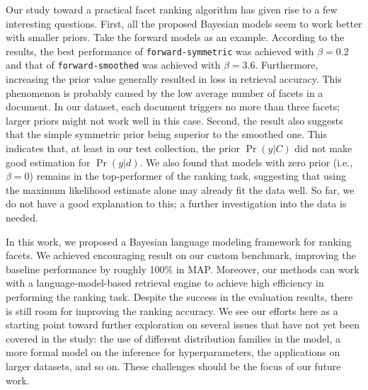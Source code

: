 Our study toward a practical facet ranking algorithm has given rise to a few
interesting questions.  First, all the proposed Bayesian models seem to work
better with smaller priors.  Take the forward models as an example.  According
to the results, the best performance of {\tt forward-symmetric} was achieved
with $\beta = 0.2$ and that of {\tt forward-smoothed} was achieved with $\beta
= 3.6$.  Furthermore, increasing the prior value generally resulted in loss in
retrieval accuracy.  This phenomenon is probably caused by the low average
number of facets in a document.  In our dataset, each document triggers no more
than three facets; larger priors might not work well in this case.  Second, the
result also suggests that the simple symmetric prior being superior to the
smoothed one.  This indicates that, at least in our test collection, the prior
$\Pr(y|C)$ did not make good estimation for $\Pr(y|d)$.  We also found that
models with zero prior (i.e., $\beta = 0$) remains in the top-performer of the
ranking task, suggesting that using the maximum likelihood estimate alone may
already fit the data well.  So far, we do not have a good explanation to this;
a further investigation into the data is needed.

In this work, we proposed a Bayesian language modeling framework for ranking
facets.  We achieved encouraging result on our custom benchmark, improving the
baseline performance by roughly 100\% in MAP.  Moreover, our methods can work
with a language-model-based retrieval engine to achieve high efficiency in
performing the ranking task.  Despite the success in the evaluation results,
there is still room for improving the ranking accuracy.  We see our efforts
here as a starting point toward further exploration on several issues that have
not yet been covered in the study: the use of different distribution families
in the model, a more formal model on the inference for hyperparameters, the
applications on larger datasets, and so on.  These challenges should be the
focus of our future work.


